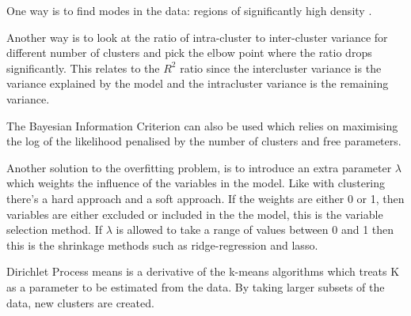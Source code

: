 One way is to find modes in the data: regions of significantly high density \citep{Duong:2008eu,JING:2012ek}.

Another way is to look at the ratio of intra-cluster to inter-cluster variance for different number of clusters and pick the elbow point where the ratio drops significantly.
This relates to the $R^2$ ratio since the intercluster variance is the variance explained by the model and the intracluster variance is the remaining variance.

The Bayesian Information Criterion can also be used which relies on maximising the log of the likelihood penalised by the number of clusters and free parameters.

Another solution to the overfitting problem, is to introduce an extra parameter $\lambda$ which weights the influence of the variables in the model.
Like with clustering there's a hard approach and a soft approach.
If the weights are either 0 or 1, then variables are either excluded or included in the the model, this is the variable selection method.
If $\lambda$ is allowed to take a range of values between 0 and 1 then this is the shrinkage methods such as ridge-regression and lasso.

Dirichlet Process means is a derivative of the k-means algorithms which treats K as a parameter to be estimated from the data.
By taking larger subsets of the data, new clusters are created.

